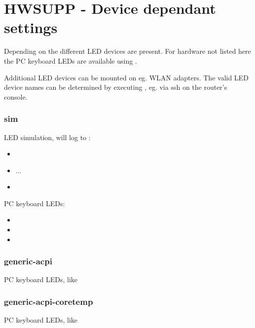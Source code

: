 
\section{HWSUPP - Device dependant settings}

  Depending on the  different LED devices are present.
  For hardware not listed here the PC keyboard LEDs are available using
  .

  Additional LED devices can be mounted on eg. WLAN adapters.
  The valid LED device names can be determined by executing ,
  eg. via ssh on the router's console.


\subsubsection{sim}
LED simulation, will log to :
\begin{itemize}
  \item {}
  \item ...
  \item {}
\end{itemize}

PC keyboard LEDs:
\begin{itemize}
  \item {}
  \item {}
  \item {}
\end{itemize}

\subsubsection{generic-acpi}
PC keyboard LEDs, like 

\subsubsection{generic-acpi-coretemp}
PC keyboard LEDs, like 

